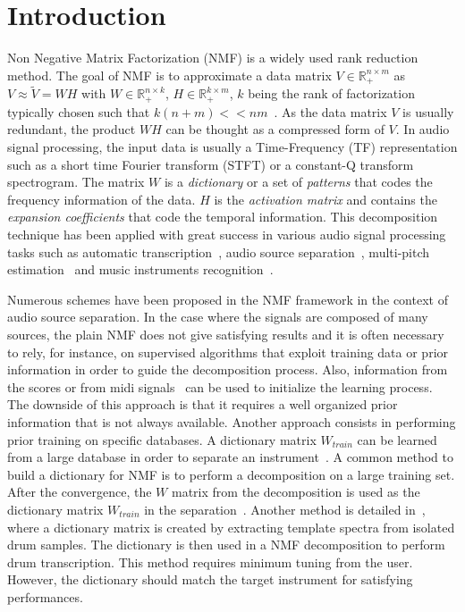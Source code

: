 \section{Introduction}
\label{sec:intro}

Non Negative Matrix Factorization (NMF) is a widely used rank reduction method. The goal of NMF is to approximate a data matrix $V \in \mathbb{R}_{+}^{n \times m} $ as $V \approx \tilde{V} = WH$ with $W \in \mathbb{R}_{+}^{n \times k}$, $H \in \mathbb{R}_{+}^{k \times m}$, $k$ being the rank of factorization typically chosen such that \mbox{$k(n+m) << nm  $}~\cite{lee99}. As the data matrix $V$ is usually redundant, the product $WH$ can be thought as a compressed form of $V$. In audio signal processing, the input data is usually a Time-Frequency (TF) representation such as a short time Fourier transform (STFT) or a constant-Q transform spectrogram. The matrix $W$ is a {\em dictionary} or a set of {\em patterns} that codes the frequency information of the data. $H$ is the {\em activation matrix} and contains the {\em expansion coefficients} that code the temporal information.
This decomposition technique has been applied with great success in various audio signal processing tasks such as automatic transcription~\cite{EwertM12,NB:ICASSP-07}, audio source separation~\cite{HennequinDAFx2010,JLD:TASLP10}, multi-pitch estimation~\cite{raczynski2007multipitch} and music instruments recognition~\cite{cichocki2009nonnegative}.

Numerous schemes have been proposed in the NMF framework in the context of audio source separation. In the case where the signals are composed of many sources, the plain NMF does not give satisfying results and it is often necessary to rely, for instance, on supervised algorithms that exploit training data or prior information in order to guide the decomposition process. Also, information from the scores or from midi signals~\cite{EwertM12} can be used to initialize the learning process. The downside of this approach is that it requires a well organized prior information that is not always available. Another approach consists in performing prior training on specific databases. A dictionary matrix $W_{train}$ can be learned from a large database in order to separate an instrument~\cite{jaureguiberry2011adaptation,wudrum}. A common method to build a dictionary for NMF is to perform a decomposition on a large training set. After the convergence, the $W$ matrix from the decomposition is used as the dictionary matrix $W_{train}$ in the separation~\cite{jaureguiberry2011adaptation}. Another method is detailed in~\cite{wudrum}, where a dictionary matrix is created by extracting template spectra from isolated drum samples. The dictionary is then used in a NMF decomposition to perform drum transcription. This method requires minimum tuning from the user. However, the dictionary should match the target instrument for satisfying performances. 

